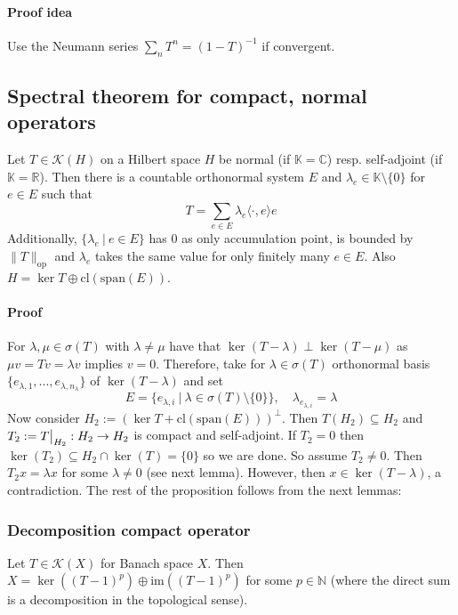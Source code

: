 \documentclass{scrartcl}
\newcommand{\R}{\mathbb{R}}
\newcommand{\N}{\mathbb{N}}
\newcommand{\C}{\mathbb{C}}
\newcommand\restr[2]{{
    \left.\kern-\nulldelimiterspace
    #1
    \vphantom{\big|}
    \right|_{#2}
}}
\begin{document}
\paragraph{Proof idea} Use the Neumann series $\sum_n T^n = (1 - T)^{-1}$ if convergent.

\subsection{Spectral theorem for compact, normal operators}
\label{spectral_theorem_operator}
Let $T \in \mathcal{K}(H)$ on a Hilbert space $H$ be normal (if $\mathbb{K} = \C$) resp. self-adjoint (if $\mathbb{K} = \R$). Then there is a countable orthonormal system $E$ and $\lambda_e \in \mathbb{K} \setminus \{0\}$ for $e \in E$ such that
\begin{equation*}
    T = \sum_{e \in E} \lambda_e \langle \cdot, e \rangle e
\end{equation*}
Additionally, $\{ \lambda_e \ | \ e \in E \}$ has $0$ as only accumulation point, is bounded by $\| T \|_{\mathrm{op}}$ and $\lambda_e$ takes the same value for only finitely many $e \in E$. Also $H = \ker T \oplus \mathrm{cl}(\mathrm{span}(E))$.
\paragraph{Proof} For $\lambda, \mu \in \sigma(T)$ with $\lambda \neq \mu$ have that $\ker(T - \lambda) \perp \ker(T - \mu)$ as $\mu v = T v = \lambda v$ implies $v = 0$. Therefore, take for $\lambda \in \sigma(T)$ orthonormal basis $\{ e_{\lambda, 1}, ..., e_{\lambda, n_\lambda} \}$ of $\ker(T - \lambda)$ and set
\begin{equation*}
    E = \{ e_{\lambda, i} \ | \ \lambda \in \sigma(T) \setminus \{0\} \}, \quad \lambda_{e_{\lambda, i}} = \lambda
\end{equation*}
Now consider $H_2 := (\ker T + \mathrm{cl}(\mathrm{span}(E)))^\perp$. Then $T(H_2) \subseteq H_2$ and $T_2 := \restr{T}{H_2}: H_2 \to H_2$ is compact and self-adjoint. If $T_2 = 0$ then $\ker(T_2) \subseteq H_2 \cap \ker(T) = \{0\}$ so we are done. 
So assume $T_2 \neq 0$. Then $T_2x = \lambda x$ for some $\lambda \neq 0$ (see next lemma). However, then $x \in \ker(T - \lambda)$, a contradiction.
The rest of the proposition follows from the next lemmas:

\subsubsection{Decomposition compact operator}
\label{decomposition_compact_operator}
Let $T \in \mathcal{K}(X)$ for Banach space $X$. Then $X = \ker((T - 1)^p) \oplus \mathrm{im}((T - 1)^p)$ for some $p \in \N$ (where the direct sum is a decomposition in the topological sense).
\end{document}

